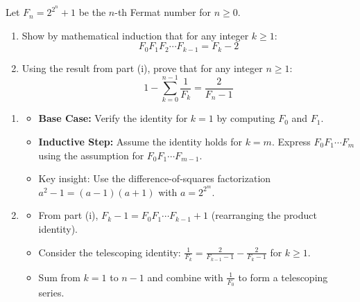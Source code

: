 \begin{problem}
Let $F_n = 2^{2^n} + 1$ be the $n$-th Fermat number for $n \geq 0$.

\begin{enumerate}[leftmargin=*]
    \item[i)] Show by mathematical induction that for any integer $k \geq 1$:
    \[ F_0 F_1 F_2 \cdots F_{k-1} = F_k - 2 \]
    
    \item[ii)] Using the result from part (i), prove that for any integer $n \geq 1$:
    \[ 1 - \sum_{k=0}^{n-1} \frac{1}{F_k} = \frac{2}{F_n - 1} \]
\end{enumerate}
\end{problem}

\begin{hint}
\begin{enumerate}[leftmargin=*]
    \item[i)]
    \begin{itemize}[leftmargin=*]
        \item \textbf{Base Case:} Verify the identity for $k=1$ by computing $F_0$ and $F_1$.
        \item \textbf{Inductive Step:} Assume the identity holds for $k=m$. Express $F_0 F_1 \cdots F_m$ using the assumption for $F_0 F_1 \cdots F_{m-1}$.
        \item Key insight: Use the difference-of-squares factorization $a^2 - 1 = (a-1)(a+1)$ with $a = 2^{2^m}$.
    \end{itemize}
    
    \item[ii)]
    \begin{itemize}[leftmargin=*]
        \item From part (i), $F_k - 1 = F_0 F_1 \cdots F_{k-1} + 1$ (rearranging the product identity).
        \item Consider the telescoping identity: $\frac{1}{F_k} = \frac{2}{F_{k-1}-1} - \frac{2}{F_k-1}$ for $k \geq 1$.
        \item Sum from $k=1$ to $n-1$ and combine with $\frac{1}{F_0}$ to form a telescoping series.
    \end{itemize}
\end{enumerate}
\end{hint}

